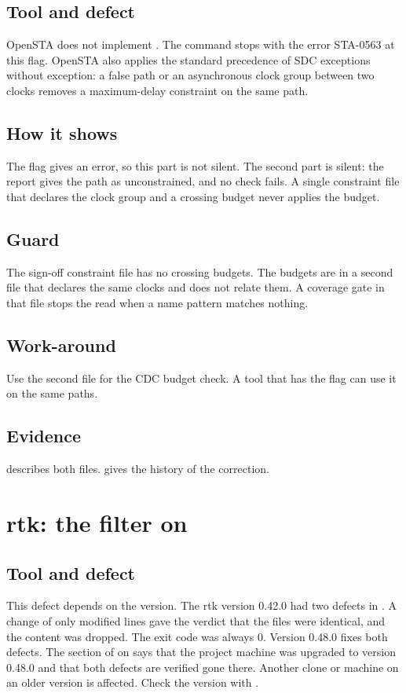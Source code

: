 \subsection*{Tool and defect}
OpenSTA does not implement . The command  stops with the error STA-0563 at this flag. OpenSTA also applies the standard precedence of SDC exceptions without exception: a false path or an asynchronous clock group between two clocks removes a maximum-delay constraint on the same path.

\subsection*{How it shows}
The flag gives an error, so this part is not silent. The second part is silent: the report gives the path as unconstrained, and no check fails. A single constraint file that declares the clock group and a crossing budget never applies the budget.

\subsection*{Guard}
The sign-off constraint file has no crossing budgets. The budgets are in a second file that declares the same clocks and does not relate them. A coverage gate in that file stops the read when a name pattern matches nothing.

\subsection*{Work-around}
Use the second file for the CDC budget check. A tool that has the flag can use it on the same paths.

\subsection*{Evidence}
 describes both files.  gives the history of the correction.

\section{rtk: the filter on \texorpdfstring{}{diff}}\label{tm:defect:rtk-diff}
\subsection*{Tool and defect}
This defect depends on the version. The rtk version 0.42.0 had two defects in . A change of only modified lines gave the verdict that the files were identical, and the content was dropped. The exit code was always 0. Version 0.48.0 fixes both defects. The section of  on  says that the project machine was upgraded to version 0.48.0 and that both defects are verified gone there. Another clone or machine on an older version is affected. Check the version with .

